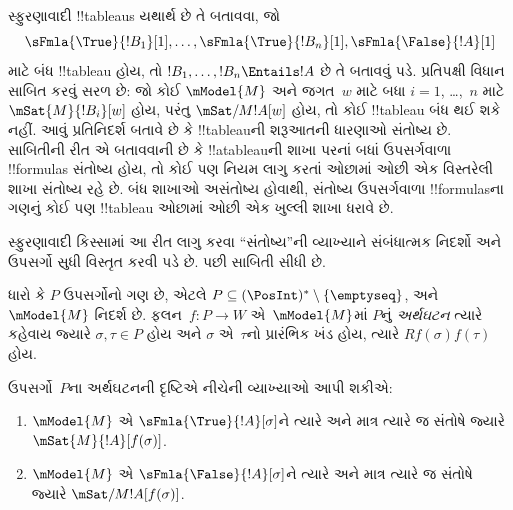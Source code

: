 \documentclass[../../../include/open-logic-section]{subfiles}
\begin{document}


\begin{explain}
  સ્ફુરણાવાદી !!{tableau}s યથાર્થ છે તે બતાવવા,
  જો
  \[
  \sFmla{\True}{!B_1}[1], \dots, \sFmla{\True}{!B_n}[1], \sFmla{\False}{!A}[1]
  \]
  માટે બંધ !!{tableau} હોય, તો
  $!B_1, \dots, !B_n \Entails !A$ છે તે બતાવવું પડે.
  પ્રતિપક્ષી વિધાન સાબિત કરવું સરળ છે: જો કોઈ
  $\mModel{M}$ અને જગત~$w$ માટે બધા $i=1$,
  \dots,~$n$ માટે $\mSat{M}{!B_i}[w]$ હોય,
  પરંતુ $\mSat/{M}{!A}[w]$ હોય, તો કોઈ
  !!{tableau} બંધ થઈ શકે નહીં.
  આવું પ્રતિનિદર્શ બતાવે છે કે !!{tableau}ની
  શરૂઆતની ધારણાઓ સંતોષ્ય છે. સાબિતીની રીત એ
  બતાવવાની છે કે !!a{tableau}ની શાખા પરનાં બધાં
  ઉપસર્ગવાળા !!{formula}s સંતોષ્ય હોય, તો કોઈ પણ
  નિયમ લાગુ કરતાં ઓછામાં ઓછી એક વિસ્તરેલી શાખા
  સંતોષ્ય રહે છે. બંધ શાખાઓ અસંતોષ્ય હોવાથી,
  સંતોષ્ય ઉપસર્ગવાળા !!{formula}sના ગણનું કોઈ પણ
  !!{tableau} ઓછામાં ઓછી એક ખુલ્લી શાખા ધરાવે છે.

  સ્ફુરણાવાદી કિસ્સામાં આ રીત લાગુ કરવા
  ``સંતોષ્ય''ની વ્યાખ્યાને સંબંધાત્મક નિદર્શો અને
  ઉપસર્ગો સુધી વિસ્તૃત કરવી પડે છે. પછી સાબિતી
  સીધી છે.
\end{explain}

\begin{defn}
  ધારો કે $P$ ઉપસર્ગોનો ગણ છે, એટલે
  $P \subseteq (\PosInt)^* \setminus \{\emptyseq\}$,
  અને $\mModel{M}$ નિદર્શ છે.
  ફલન~$f\colon P \to W$ એ~$\mModel{M}$માં
  $P$નું \emph{અર્થઘટન} ત્યારે કહેવાય જ્યારે
  $\sigma,\tau\in P$ હોય અને $\sigma$ એ~$\tau$નો
  પ્રારંભિક ખંડ હોય, ત્યારે $Rf(\sigma)f(\tau)$ હોય.

  ઉપસર્ગો~$P$ના અર્થઘટનની દૃષ્ટિએ નીચેની
  વ્યાખ્યાઓ આપી શકીએ:
  \begin{enumerate}
  \item $\mModel{M}$ એ $\sFmla{\True}{!A}[\sigma]$ને
    ત્યારે અને માત્ર ત્યારે જ સંતોષે જ્યારે
    $\mSat{M}{!A}[f(\sigma)]$.
  \item $\mModel{M}$ એ $\sFmla{\False}{!A}[\sigma]$ને
    ત્યારે અને માત્ર ત્યારે જ સંતોષે જ્યારે
    $\mSat/{M}{!A}[f(\sigma)]$.
  \end{enumerate}
\end{defn}
\end{document}
